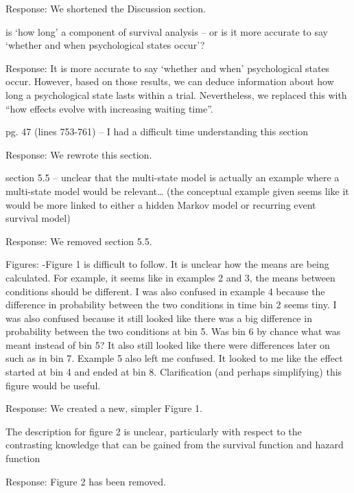 \documentclass[
]{article}
\renewenvironment{quote}{\begin{leftbar}}{\end{leftbar}}
\begin{document}
Response: We shortened the Discussion section.

\begin{quote}
is `how long' a component of survival analysis -- or is it more accurate
to say `whether and when psychological states occur'?
\end{quote}

Response: It is more accurate to say `whether and when' psychological
states occur. However, based on those results, we can deduce information
about how long a psychological state lasts within a trial. Nevertheless,
we replaced this with ``how effects evolve with increasing waiting
time''.

\begin{quote}
pg. 47 (lines 753-761) -- I had a difficult time understanding this
section
\end{quote}

Response: We rewrote this section.

\begin{quote}
section 5.5 -- unclear that the multi-state model is actually an example
where a multi-state model would be relevant\ldots{} (the conceptual
example given seems like it would be more linked to either a hidden
Markov model or recurring event survival model)
\end{quote}

Response: We removed section 5.5.

\begin{quote}
Figures: -Figure 1 is difficult to follow. It is unclear how the means
are being calculated. For example, it seems like in examples 2 and 3,
the means between conditions should be different. I was also confused in
example 4 because the difference in probability between the two
conditions in time bin 2 seems tiny. I was also confused because it
still looked like there was a big difference in probability between the
two conditions at bin 5. Was bin 6 by chance what was meant instead of
bin 5? It also still looked like there were differences later on such as
in bin 7. Example 5 also left me confused. It looked to me like the
effect started at bin 4 and ended at bin 8. Clarification (and perhaps
simplifying) this figure would be useful.
\end{quote}

Response: We created a new, simpler Figure 1.

\begin{quote}
The description for figure 2 is unclear, particularly with respect to
the contrasting knowledge that can be gained from the survival function
and hazard function
\end{quote}

Response: Figure 2 has been removed.
\end{document}
